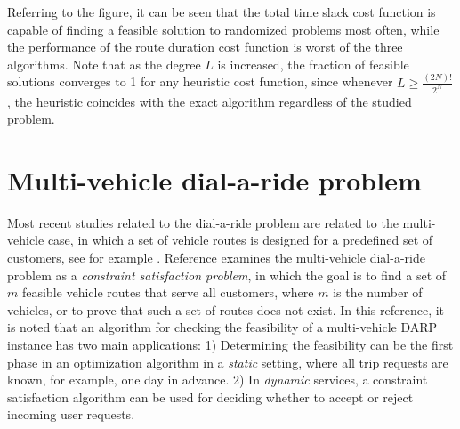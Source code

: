 \documentclass[dissertation,draft*]{aaltoseries}
\begin{document}
Referring to the figure, it can be seen that the total time slack cost function is capable of finding
a feasible solution to randomized problems most often, while the performance of the route duration cost
function is worst of the three algorithms. Note that as the degree $L$ is increased, 
the fraction of feasible solutions converges to 1 for any heuristic cost function, since whenever $L \geq \frac{(2N)!}{2^N}$,
the heuristic coincides with the exact algorithm regardless of the studied problem.



\section{Multi-vehicle dial-a-ride problem}
\label{multivehicle}
Most recent studies related to the dial-a-ride problem are related to the multi-vehicle case, in which 
a set of vehicle routes is designed for a predefined set of customers, see for example 
\cite{cordeau02, cordeau01, bent, ropke, xiang2006, melachrinoudis, parragh, garaix, berbegliathesis,berbegliafeas,berbegliapdp}.
Reference \cite{berbegliafeas} examines the multi-vehicle dial-a-ride problem as a \emph{constraint satisfaction problem}, in which the goal
is to find a set of $m$ feasible vehicle routes that serve all customers, where $m$ is the 
number of vehicles, or to prove that such a set of routes does not exist.
In this reference, it is noted that 
an algorithm for checking the feasibility of a multi-vehicle DARP instance has two main applications:  
1) Determining the feasibility can be the first phase in an 
optimization algorithm in a \emph{static} setting, where all trip requests are known, for example, one day in advance. 
2) In \emph{dynamic} services, a constraint satisfaction algorithm can be used 
for deciding whether to accept or reject incoming user requests. 
% 

\end{document}
